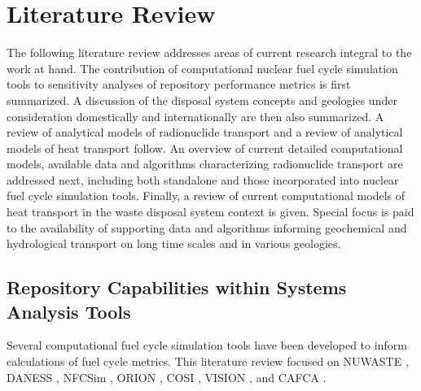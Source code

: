 \chapter{Literature Review}
\label{ch:litrev}

The following literature review addresses areas of current research
integral to the work at hand. The contribution of computational nuclear fuel
cycle simulation tools to sensitivity analyses of repository performance
metrics is first summarized. A discussion of the disposal system concepts and 
geologies under consideration domestically and internationally are then also 
summarized. A review of analytical models of radionuclide transport
and a review of analytical models of heat transport follow. An overview of 
current detailed computational models, available data and algorithms 
characterizing radionuclide transport are addressed next, including both standalone
and those incorporated into nuclear fuel cycle simulation tools. Finally, a
review of current computational models of heat transport in the waste disposal
system context is given. Special focus is paid to the availability of
supporting data and algorithms informing geochemical and hydrological
transport on long time scales and in various geologies. 

\section{Repository Capabilities within Systems Analysis Tools}
\label{sec:SA_repos}




Several computational fuel cycle simulation tools have been developed to inform 
calculations of fuel cycle metrics. This literature review focused on 
\gls{NUWASTE} \cite{abkowitz_nuclear_2010},
\gls{DANESS} \cite{yacout_daness_2011,van_den_durpel_daness:_2006}, 
\gls{NFCSim} \cite{schneider_nfcsim_2004},
ORION \cite{gregg_orion_2011},
\gls{COSI} \cite{boucher_international_2010},
\gls{VISION} \cite{yacout_vision_2006, wilson_comparing_2011, 
radel_repository_2007, boucher_international_2010}, and
\gls{CAFCA} \cite{guerin_impact_2009}.


